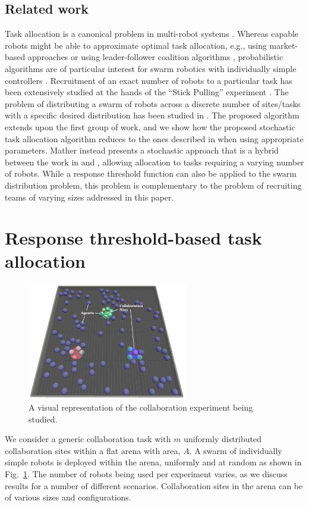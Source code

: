 \documentclass{TeXstyles/DARS/svmult}  %
\begin{document}
\subsection{Related work}
Task allocation is a canonical problem in multi-robot systems \cite{Gerkey2004}. Whereas capable robots might be able to approximate optimal task allocation, e.g., using market-based approaches \cite{amstutz2008distributed,vig2007coalition} or using  leader-follower coalition algorithms \cite{Chen2011}, probabilistic algorithms are of particular interest for swarm robotics with individually simple controllers \cite{dantu2012comparison}. Recruitment of an exact number of robots to a particular task has been extensively studied at the hands of the ``Stick Pulling'' experiment \cite{Lerman2001,Martinoli2004}. The problem of distributing a swarm of robots across a discrete number of sites/tasks with a specific desired distribution has been studied in \cite{Berman2009,Correll2008}. The proposed algorithm extends upon the first group of work, and we show how the proposed stochastic task allocation algorithm reduces to the ones described in \cite{Lerman2001,Martinoli2004} when using appropriate parameters.  Mather \cite{mather2010towards} instead presents a stochastic approach that is a hybrid between the work in \cite{Berman2009} and \cite{Martinoli2004}, allowing allocation to tasks requiring a varying number of robots.
While a response threshold function can also be applied to the swarm distribution problem, this problem is complementary to the problem of recruiting teams of varying sizes addressed in this paper. 



\section{Response threshold-based task allocation}\label{sec:expsetup}
\begin{figure}[!htb]
\centering\includegraphics[width=7cm]{figures/setup.png}
\caption{A visual representation of the collaboration experiment being studied.}\label{fig:setup}
\end{figure}
We consider a generic collaboration task with $m$ uniformly distributed collaboration sites within a flat arena with area, $A$. A swarm of individually simple robots is deployed within the arena, uniformly and at random as shown in Fig.~\ref{fig:setup}. The number of robots being used per experiment varies, as we discuss results for a number of different scenarios. Collaboration sites in the arena can be of various sizes and configurations.
\end{document}
